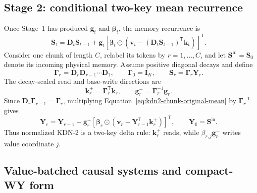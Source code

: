\documentclass[11pt]{article}
\newcommand{\ve}[1]{\boldsymbol{#1}}
\newcommand{\tr}{\mathsf{T}}
\begin{document}
\subsection{Stage 2: conditional two-key mean recurrence}
\label{app:kdn2-conditional-mean}

Once Stage~1 has produced $\ve{g}_t$ and $\ve{\beta}_t$, the memory recurrence is
\begin{equation}
  \ve{S}_t
  =\ve{D}_t\ve{S}_{t-1}
   +\ve{g}_t
    \left[
      \ve{\beta}_t\odot
      \left(
        \ve{v}_t-(\ve{D}_t\ve{S}_{t-1})^{\tr}\ve{k}_t
      \right)
    \right]^{\tr}.
  \label{eq:kdn2-chunk-original-mean}
\end{equation}
Consider one chunk of length $C$, relabel its tokens by $r=1,\ldots,C$, and let
$\ve{S}^{\mathrm{in}}=\ve{S}_0$ denote its incoming physical memory.  Assume positive diagonal
decays and define
\begin{equation}
  \ve{\Gamma}_r
  =\ve{D}_r\ve{D}_{r-1}\cdots\ve{D}_1,
  \qquad
  \ve{\Gamma}_0=\ve{I}_K,
  \qquad
  \ve{S}_r=\ve{\Gamma}_r\ve{Y}_r.
  \label{eq:kdn2-chunk-cumulative-decay}
\end{equation}
The decay-scaled read and base-write directions are
\begin{equation}
  \ve{k}^{+}_r=\ve{\Gamma}_r^{\tr}\ve{k}_r,
  \qquad
  \ve{g}^{-}_r=\ve{\Gamma}_r^{-1}\ve{g}_r.
  \label{eq:kdn2-chunk-two-keys}
\end{equation}
Since $\ve{D}_r\ve{\Gamma}_{r-1}=\ve{\Gamma}_r$, multiplying
Equation~\eqref{eq:kdn2-chunk-original-mean} by $\ve{\Gamma}_r^{-1}$ gives
\begin{equation}
  \ve{Y}_r
  =\ve{Y}_{r-1}
   +\ve{g}^{-}_r
    \left[
      \ve{\beta}_r\odot
      \left(
        \ve{v}_r-\ve{Y}_{r-1}^{\tr}\ve{k}^{+}_r
      \right)
    \right]^{\tr},
  \qquad
  \ve{Y}_0=\ve{S}^{\mathrm{in}}.
  \label{eq:kdn2-chunk-normalized-mean}
\end{equation}
Thus normalized KDN-2 is a two-key delta rule: $\ve{k}^{+}_r$ reads, while
$\beta_{r,j}\ve{g}^{-}_r$ writes value coordinate $j$.

\subsection{Value-batched causal systems and compact-WY form}
\label{app:kdn2-triangular-systems}
\end{document}
